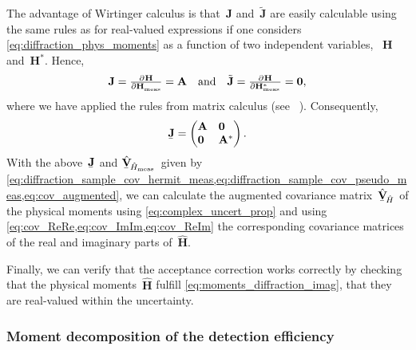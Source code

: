 The advantage of Wirtinger calculus is that~$\mathbf{J}$
and~$\tilde{\mathbf{J}}$ are easily calculable using the same rules as
for real-valued expressions if one considers
\cref{eq:diffraction_phys_moments} as a function of two independent
variables, ~$\mathbf{H}$ and~$\mathbf{H}^*$.  Hence,
\begin{equation}
  \mathbf{J}
  = \pd{\mathbf{H}}{\mathbf{H}_\text{meas}}
  = \mathbf{A}
  \quad\text{and}\quad
  \tilde{\mathbf{J}}
  = \pd{\mathbf{H}}{{\mathbf{H}_\text{meas}^*}}
  = \mathbf{0},
\end{equation}
where we have applied the rules from matrix calculus (see \eg\
).  Consequently,
\begin{equation}
  \underaccent{\bar}{\mathbf{J}}
  = \begin{pmatrix*}[l]
    \mathbf{A} & \mathbf{0} \\
    \mathbf{0} & \mathbf{A}^*
  \end{pmatrix*}.
\end{equation}
With the above~$\underaccent{\bar}{\mathbf{J}}$ and
$\hat{\underaccent{\bar}{\covMatSym}}_{\!\hat{H}_\text{meas}}$~given
by
\cref{eq:diffraction_sample_cov_hermit_meas,eq:diffraction_sample_cov_pseudo_meas,eq:cov_augmented},
we can calculate the augmented covariance
matrix~$\hat{\underaccent{\bar}{\covMatSym}}_{\!\hat{H}}$ of the
physical moments using \cref{eq:complex_uncert_prop} and using
\cref{eq:cov_ReRe,eq:cov_ImIm,eq:cov_ReIm} the corresponding
covariance matrices of the real and imaginary parts of~$\hat{\mathbf{H}}$.

Finally, we can verify that the acceptance correction works correctly
by checking that the physical moments~$\hat{\mathbf{H}}$ fulfill
\cref{eq:moments_diffraction_imag}, \ie that they are real-valued
within the uncertainty.


\subsubsection{Moment decomposition of the detection efficiency}%
\label{sec:diffraction:acceptance_moment_decomp}


